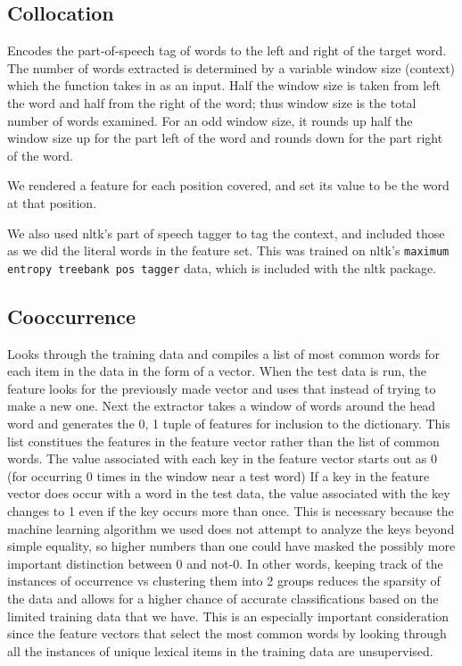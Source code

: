 \documentclass{article}
\begin{document}
\subsection{Collocation}

Encodes the part-of-speech tag of words to the left and right of the target
word. The number of words extracted is determined by a variable window size
(context) which the function takes in as an input. Half the window size is
taken from left the word and half from the right of the word; thus window size
is the total number of words examined. For an odd window size, it rounds up
half the window size up for the part left of the word and rounds down for the
part right of the word.

We rendered a feature for each position covered, and set its value to be the
word at that position.

We also used nltk's part of speech tagger to tag the context, and included those
as we did the literal words in the feature set.  This was trained on nltk's
\verb+maximum entropy treebank pos tagger+ data, which is included with the nltk
package.

\subsection{Cooccurrence}

Looks through the training data and compiles a list of most common
words for each item in the data in the form of a vector. When the test
data is run, the feature looks for the previously made vector and uses that instead of
trying to make a new one. Next the extractor takes a window of words
around the head word and generates the 0, 1 tuple of features for
inclusion to the dictionary. This list constitues the features in the
feature vector rather than the list of common words. The value
associated with each key in the feature vector starts out as 0 (for
occurring 0 times in the window near a test word) If a key in the
feature vector does occur with a word in the test data, the value
associated with the key changes to 1 even if the key occurs more than
once.  This is necessary because the machine learning algorithm we
used does not attempt to analyze the keys beyond simple equality, so
higher numbers than one could have masked the possibly more important
distinction between 0 and not-0. In other words, keeping track of the
instances of occurrence vs clustering them into 2 groups reduces the
sparsity of the data and allows for a higher chance of accurate classifications
based on the limited training data that we have. This is an especially
important consideration since the feature vectors that select the most
common words by looking through all the instances of unique lexical
items in the training data are unsupervised.
\end{document}
